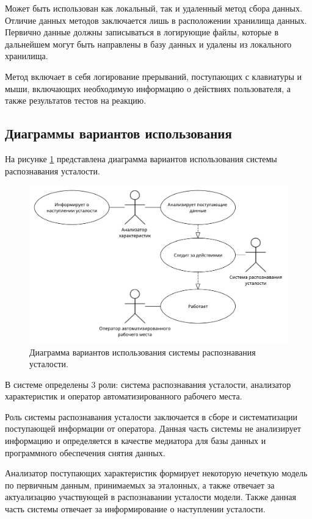 Может быть использован как локальный, так и удаленный метод сбора данных. Отличие данных методов заключается лишь в расположении хранилища данных. Первично данные должны записываться в логирующие файлы, которые в дальнейшем могут быть направлены в базу данных и удалены из локального хранилища.

Метод включает в себя логирование прерываний, поступающих с клавиатуры и мыши, включающих необходимую информацию о действиях пользователя, а также результатов тестов на реакцию.

\subsection{Диаграммы вариантов использования}
На рисунке \ref{fig:useCase} представлена диаграмма вариантов использования системы распознавания усталости.
\begin{figure}[H]
	\centering
	\includegraphics[width=\textwidth]{img/useCaseDiagram.pdf}
	\caption{Диаграмма вариантов использования системы распознавания усталости.}
	\label{fig:useCase}
\end{figure}

В системе определены 3 роли: система распознавания усталости, анализатор характеристик и оператор автоматизированного рабочего места.

Роль системы распознавания усталости заключается в сборе и систематизации поступающей информации от оператора. Данная часть системы не анализирует информацию и определяется в качестве медиатора для базы данных и программного обеспечения снятия данных.

Анализатор поступающих характеристик формирует некоторую нечеткую модель по первичным данным, принимаемых за эталонных, а также отвечает за актуализацию участвующей в распознавании усталости модели. Также данная часть системы отвечает за информирование о наступлении усталости.

